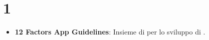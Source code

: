 \section{1}
\begin{itemize}
	\item
	\textbf{12 Factors App Guidelines}: Insieme di  per lo sviluppo di .
\end{itemize}
\newpage